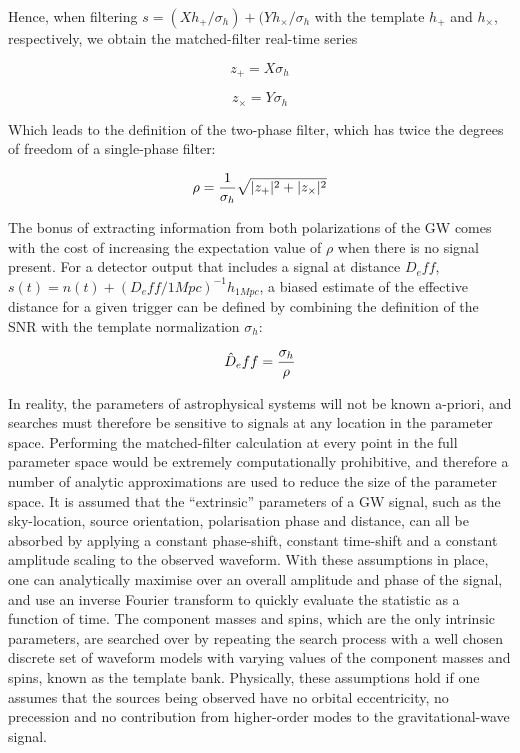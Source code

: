 \documentclass[binding=0.6cm, LaM]{sapthesis}
\begin{document}
	Hence, when filtering  $s = (Xh_{+}/\sigma_{h}) + (Y h_{\times}/\sigma_{h}$ 
	with the template $h_{+}$ and $h_{\times}$, 
	respectively, we obtain the matched-filter real-time series
 
		\begin{equation}
			z_{+} = X\sigma_{h}
		\end{equation}

		\begin{equation}
			z_{\times} = Y \sigma_{h} 
		\end{equation}

	Which leads to the definition of the two-phase filter, 
	which has twice the degrees of freedom of a single-phase filter:

		\begin{equation}
			\rho = {1 \over \sigma_h} \sqrt{|z_{+}| ^2+ |z_{\times}|^2}
		\end{equation}

	The bonus of extracting information from both polarizations of the GW 
	comes with the cost of increasing the expectation value of $\rho$ when there is no signal present. 
	For a detector output that includes a signal at distance $D_eff$, 
	$s(t) = n(t) + (D_eff/1 Mpc)^{-1}h_{1Mpc}$, 
	a biased estimate of the effective distance for a given trigger 
	can be defined by combining the definition of the SNR with the template normalization $\sigma_h$:

		\begin{equation}
			\hat D_eff = {{\sigma_h} \over {\rho}}
		\end{equation}

	In reality, the parameters of astrophysical systems will not be known a-priori, 
	and searches must therefore be sensitive to signals at any location in the parameter space. 
	Performing the matched-filter calculation at every point in the full parameter space 
	would be extremely computationally prohibitive, 
	and therefore a number of analytic approximations are used to reduce the size of the parameter space. 
	It is assumed that the “extrinsic” parameters of a GW signal, 
	such as the sky-location, source orientation, polarisation phase and distance, 
	can all be absorbed by applying a constant phase-shift, 
	constant time-shift and a constant amplitude scaling to the observed waveform. 
	With these assumptions in place, 
	one can analytically maximise over an overall amplitude and phase of the signal, 
	and use an inverse Fourier transform to quickly evaluate the statistic as a function of time. 
	The component masses and spins, 
	which are the only intrinsic parameters, 
	are searched over by repeating the search process with a well chosen discrete set of waveform models 
	with varying values of the component masses and spins, 
	known as the template bank. 
	Physically, these assumptions hold if one assumes that the sources being observed 
	have no orbital eccentricity, no precession and no contribution from higher-order modes 
	to the gravitational-wave signal. 
\end{document}
